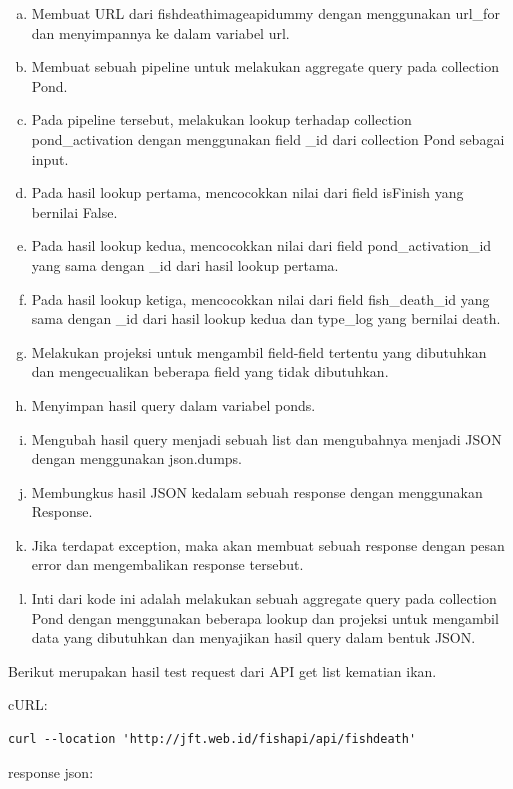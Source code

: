 \begin{enumerate}[1.]
\begin{enumerate}[a.]
\item Membuat URL dari fishdeathimageapidummy dengan menggunakan url\_for dan menyimpannya ke dalam variabel url.
\item Membuat sebuah pipeline untuk melakukan aggregate query pada collection Pond.
\item Pada pipeline tersebut, melakukan lookup terhadap collection pond\_activation dengan menggunakan field \_id dari collection Pond sebagai input.
\item Pada hasil lookup pertama, mencocokkan nilai dari field isFinish yang bernilai False.
\item Pada hasil lookup kedua, mencocokkan nilai dari field pond\_activation\_id yang sama dengan \_id dari hasil lookup pertama.
\item Pada hasil lookup ketiga, mencocokkan nilai dari field fish\_death\_id yang sama dengan \_id dari hasil lookup kedua dan type\_log yang bernilai death.
\item Melakukan projeksi untuk mengambil field-field tertentu yang dibutuhkan dan mengecualikan beberapa field yang tidak dibutuhkan.
\item Menyimpan hasil query dalam variabel ponds.
\item Mengubah hasil query menjadi sebuah list dan mengubahnya menjadi JSON dengan menggunakan json.dumps.
\item Membungkus hasil JSON kedalam sebuah response dengan menggunakan Response.
\item Jika terdapat exception, maka akan membuat sebuah response dengan pesan error dan mengembalikan response tersebut.
\item Inti dari kode ini adalah melakukan sebuah aggregate query pada collection Pond dengan menggunakan beberapa lookup dan projeksi untuk mengambil data yang dibutuhkan dan menyajikan hasil query dalam bentuk JSON.
\end{enumerate}


Berikut merupakan hasil test request dari API get list kematian ikan.

cURL:

\begin{lstlisting}
curl --location 'http://jft.web.id/fishapi/api/fishdeath'
\end{lstlisting}

response json:


\end{enumerate}
